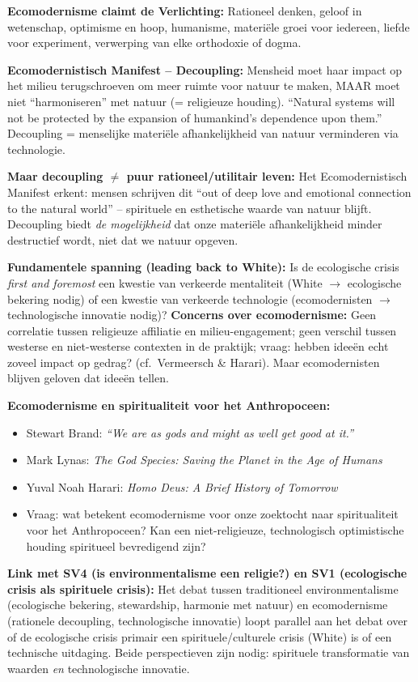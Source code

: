 \documentclass[a4paper,10pt]{article}
\begin{document}
\textbf{Ecomodernisme claimt de Verlichting:} Rationeel denken, geloof in wetenschap, optimisme en hoop, humanisme, materiële groei voor iedereen, liefde voor experiment, verwerping van elke orthodoxie of dogma.

\textbf{Ecomodernistisch Manifest -- Decoupling:} Mensheid moet haar impact op het milieu terugschroeven om meer ruimte voor natuur te maken, MAAR moet niet ``harmoniseren'' met natuur (= religieuze houding). ``Natural systems will not be protected by the expansion of humankind's dependence upon them.'' Decoupling = menselijke materiële afhankelijkheid van natuur verminderen via technologie.

\textbf{Maar decoupling $\ne$ puur rationeel/utilitair leven:} Het Ecomodernistisch Manifest erkent: mensen schrijven dit ``out of deep love and emotional connection to the natural world'' -- spirituele en esthetische waarde van natuur blijft. Decoupling biedt \textit{de mogelijkheid} dat onze materiële afhankelijkheid minder destructief wordt, niet dat we natuur opgeven.

\textbf{Fundamentele spanning (leading back to White):} Is de ecologische crisis \textit{first and foremost} een kwestie van verkeerde mentaliteit (White $\to$ ecologische bekering nodig) of een kwestie van verkeerde technologie (ecomodernisten $\to$ technologische innovatie nodig)? \textbf{Concerns over ecomodernisme:} Geen correlatie tussen religieuze affiliatie en milieu-engagement; geen verschil tussen westerse en niet-westerse contexten in de praktijk; vraag: hebben ideeën echt zoveel impact op gedrag? (cf.\ Vermeersch \& Harari). Maar ecomodernisten blijven geloven dat ideeën tellen.

\textbf{Ecomodernisme en spiritualiteit voor het Anthropoceen:}
\begin{itemize}[noitemsep]
  \item Stewart Brand: \textit{``We are as gods and might as well get good at it.''}
  \item Mark Lynas: \textit{The God Species: Saving the Planet in the Age of Humans}
  \item Yuval Noah Harari: \textit{Homo Deus: A Brief History of Tomorrow}
  \item Vraag: wat betekent ecomodernisme voor onze zoektocht naar spiritualiteit voor het Anthropoceen? Kan een niet-religieuze, technologisch optimistische houding spiritueel bevredigend zijn?
\end{itemize}

\textbf{Link met SV4 (is environmentalisme een religie?) en SV1 (ecologische crisis als spirituele crisis):} Het debat tussen traditioneel environmentalisme (ecologische bekering, stewardship, harmonie met natuur) en ecomodernisme (rationele decoupling, technologische innovatie) loopt parallel aan het debat over of de ecologische crisis primair een spirituele/culturele crisis (White) is of een technische uitdaging. Beide perspectieven zijn nodig: spirituele transformatie van waarden \textit{en} technologische innovatie.
\end{document}
